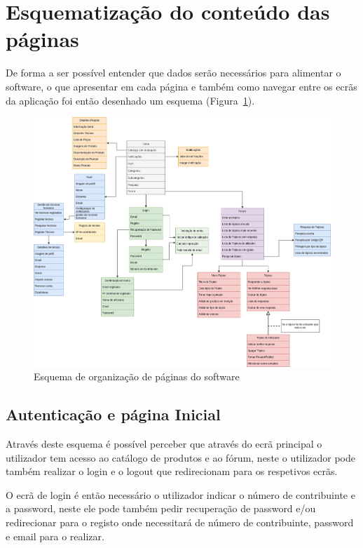 \section{Esquematização do conteúdo das páginas}

De forma a ser possível entender que dados serão necessários para alimentar o software, o que apresentar em 
cada página e também como navegar entre os ecrãs da aplicação foi então desenhado um esquema 
(Figura~\ref{fig:3}).

\begin{figure}[htb]
    \centering
    
    \includegraphics[width=\textwidth]{images/Arquiteturas/diagrama_superficial_de_aplicacao.png}
    \caption{Esquema de organização de páginas do software}
    \label{fig:3}
\end{figure}

\newpage

\subsection{Autenticação e página Inicial}

Através deste esquema é possível perceber que através do ecrã principal o utilizador tem acesso ao 
catálogo de produtos e ao fórum, neste o utilizador pode também realizar o login e o logout que 
redirecionam para os respetivos ecrãs.

O ecrã de login é então necessário o utilizador indicar o número de contribuinte e a password, neste ele 
pode também pedir recuperação de password e/ou redirecionar para o registo onde necessitará de número de 
contribuinte, password e email para o realizar.


